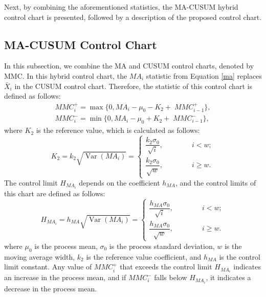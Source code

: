 \documentclass[twoside]{article}
\begin{document}
Next, by combining the aforementioned statistics, the MA-CUSUM hybrid control chart is presented, followed by a description of the proposed control chart.
\vspace{-0.6cm}
\subsection{MA-CUSUM Control Chart}
\vspace{-0.25cm}
In this subsection, we combine the MA and CUSUM control charts, denoted by MMC. In this hybrid control chart, the $MA_i$ statistic from Equation \eqref{ma} replaces $\bar{X}_i$ in the CUSUM control chart. Therefore, the statistic of this control chart is defined as follows:
\begin{equation}
\begin{aligned}
MMC_i^+ = \max\{0,  MA_i - \mu_0 - K_2 + \; MMC_{i-1}^+ \},\\
MMC_i^- = \min\{0, MA_i - \mu_0 + K_2  +\; MMC_{i-1}^- \},
\end{aligned}
\label{ma-cusum}
\end{equation}
where $K_2$ is the reference value, which is calculated as follows:
\begin{equation*}
K_2 = k_2 \sqrt{\operatorname{Var}(MA_i)} = 
\begin{cases}
\dfrac{k_2 \sigma_0}{\sqrt{i}}, \qquad \qquad  i < w ;\\
\dfrac{k_2 \sigma_0}{\sqrt{w}}, \qquad \qquad  i \ge w.
\end{cases}
\end{equation*}
The control limit $H_{MA_i}$ depends on the coefficient $h_{MA}$, and the control limits of this chart are defined as follows:
\begin{equation*}
H_{MA_i} = h_{MA} \sqrt{\operatorname{Var}(MA_i)} = 
\begin{cases}
\dfrac{h_{MA} \sigma_0}{\sqrt{i}},  \qquad \qquad i < w ;\\[10pt]
\dfrac{h_{MA} \sigma_0}{\sqrt{w}},  \qquad  \qquad i \ge w.
\end{cases}
\end{equation*}
where $\mu_0$ is the process mean, $\sigma_0$ is the process standard deviation, $w$ is the moving average width, $k_2$ is the reference value coefficient, and $h_{MA}$ is the control limit constant. Any value of $MMC_i^+$ that exceeds the control limit $H_{MA_i}$ indicates an increase in the process mean, and if $MMC_i^-$ falls below $H_{MA_i}$, it indicates a decrease in the process mean.
\vspace{-0.6cm}
\end{document}
